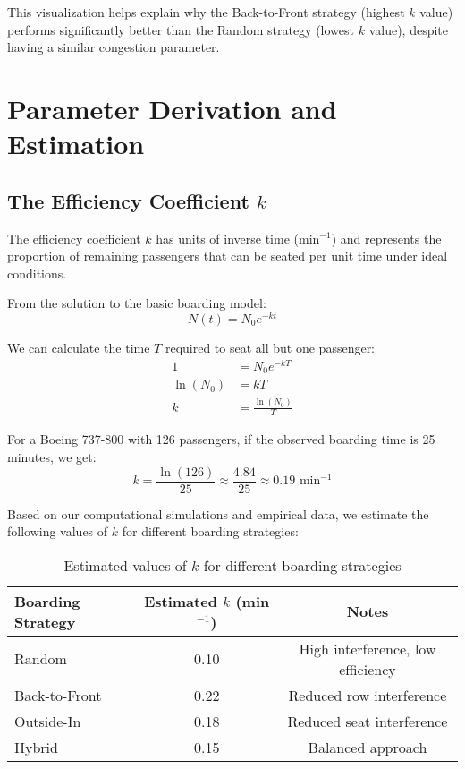 \documentclass[12pt,a4paper]{article}
\begin{document}
This visualization helps explain why the Back-to-Front strategy (highest $k$ value) performs significantly better than the Random strategy (lowest $k$ value), despite having a similar congestion parameter.

\section{Parameter Derivation and Estimation}

\subsection{The Efficiency Coefficient $k$}
The efficiency coefficient $k$ has units of inverse time (min$^{-1}$) and represents the proportion of remaining passengers that can be seated per unit time under ideal conditions.

From the solution to the basic boarding model:
\begin{equation}
N(t) = N_0 e^{-kt}
\end{equation}

We can calculate the time $T$ required to seat all but one passenger:
\begin{align}
1 &= N_0 e^{-kT} \\
\ln(N_0) &= kT \\
k &= \frac{\ln(N_0)}{T}
\end{align}

For a Boeing 737-800 with 126 passengers, if the observed boarding time is 25 minutes, we get:
\begin{equation}
k = \frac{\ln(126)}{25} \approx \frac{4.84}{25} \approx 0.19 \text{ min}^{-1}
\end{equation}

Based on our computational simulations and empirical data, we estimate the following values of $k$ for different boarding strategies:

\begin{table}[H]
\centering
\begin{tabular}{|l|c|c|}
\hline
\textbf{Boarding Strategy} & \textbf{Estimated $k$ (min$^{-1}$)} & \textbf{Notes} \\ \hline
Random & 0.10 & High interference, low efficiency \\ \hline
Back-to-Front & 0.22 & Reduced row interference \\ \hline
Outside-In & 0.18 & Reduced seat interference \\ \hline
Hybrid & 0.15 & Balanced approach \\ \hline
\end{tabular}
\caption{Estimated values of $k$ for different boarding strategies}
\label{tab:k_values}
\end{table}
\end{document}
